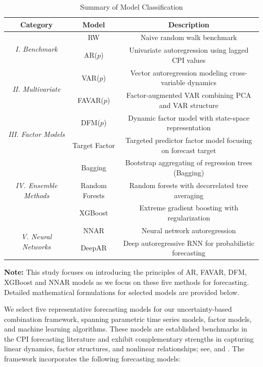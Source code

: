\documentclass[12pt]{article}
\begin{document}
\begin{table}[t]
  \centering
  \caption{Summary of Model Classification}
  \label{tab:model_summary}
  \begin{threeparttable}
  \footnotesize
  \renewcommand{\arraystretch}{1.5}
  \setlength{\tabcolsep}{5pt}
  \begin{tabular}{ccc}
  \toprule
  \textbf{Category} & \textbf{Model} & \textbf{Description} \\
  \midrule
  \multirow{2}{*}{\textit{I. Benchmark}}
   & RW & Naive random walk benchmark \\
   & AR($p$) & Univariate autoregression using lagged CPI values \\
  \midrule
  \multirow{2}{*}{\textit{II. Multivariate}}
   & VAR($p$) & Vector autoregression modeling cross-variable dynamics \\
   & FAVAR($p$) & Factor-augmented VAR combining PCA and VAR structure \\
  \midrule
  \multirow{2}{*}{\textit{III. Factor Models}}
   & DFM($p$) & Dynamic factor model with state-space representation \\
   & Target Factor & Targeted predictor factor model focusing on forecast target \\
  \midrule
  \multirow{3}{*}{\textit{IV. Ensemble Methods}}
   & Bagging & Bootstrap aggregating of regression trees (Bagging) \\
   & Random Forests & Random forests with decorrelated tree averaging \\
   & XGBoost & Extreme gradient boosting with regularization \\
  \midrule
  \multirow{2}{*}{\textit{V. Neural Networks}}
      & NNAR & Neural network autoregression  \\
   & DeepAR & Deep autoregressive RNN for probabilistic forecasting \\
  \bottomrule
  \end{tabular}
  \begin{tablenotes}
  \footnotesize
  \item \textbf{Note:} This study focuses on introducing the principles of AR, FAVAR, DFM, XGBoost and NNAR models as we focus on these five methods for forecasting. Detailed mathematical formulations for selected models are provided below.
  \end{tablenotes}
  \end{threeparttable}
  \end{table}

 We select five representative forecasting models for our uncertainty-based combination framework, spanning parametric time series models, factor models, and machine learning algorithms. These models are  established benchmarks in the CPI forecasting literature and exhibit complementary strengths in capturing linear dynamics, factor structures, and nonlinear relationships; see,  \cite{barkan2023forecasting} and \cite{sengupta2025forecasting}. The framework incorporates the following forecasting models:
\end{document}
